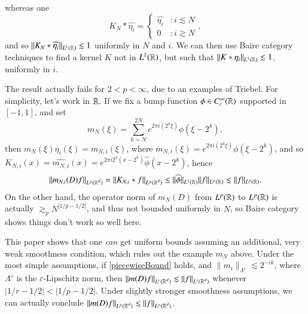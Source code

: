 whereas one
% 
%
\[ K_N * \widehat{\eta_i} = \begin{cases} \widehat{\eta_i} &: i \lesssim N \\ 0 &: i \gtrsim N \end{cases}, \]
%
and so $\| K_N * \widehat{\eta_i} \|_{L^1(\operatorname{\mathbb{R}})} \lesssim 1$ uniformly in $N$ and $i$. We can then use Baire category techniques to find a kernel $K$ not in $L^1(\operatorname{\mathbb{R}})$, but such that $\| K * \eta_i \|_{L^1(\operatorname{\mathbb{R}})} \lesssim 1$, uniformly in $i$.

The result actually fails for $2 < p < \infty$, due to an examples of Triebel. For simplicity, let's work in $\operatorname{\mathbb{R}}$. If we fix a bump function $\phi \in C_c^\infty(\operatorname{\mathbb{R}})$ supported in $[-1,1]$, and set
%
\[ m_N(\xi) = \sum_{k = N}^{2N} e^{2 \pi i (2^k \xi)} \phi(\xi - 2^k), \]
%
then $m_N(\xi) \eta_i(\xi) = m_{N,i}(\xi)$, where $m_{N,i}(\xi) = e^{2 \pi i (2^k \xi)} \phi(\xi - 2^k)$, and so $K_{N,i}(x) = \widehat{m_{N,i}}(x) = e^{2 \pi i 2^k(x - 2^k)} \widehat{\phi}(x - 2^k)$, hence
%
\[ \| m_{N,i}(D) f \|_{L^p(\operatorname{\mathbb{R}}^d)} = \| K_{N,i} * f \|_{L^p(\operatorname{\mathbb{R}}^d)} \leq \| \widehat{\phi} \|_{L^1(\operatorname{\mathbb{R}})} \| f \|_{L^p(\operatorname{\mathbb{R}})} \lesssim \| f \|_{L^p(\operatorname{\mathbb{R}})}. \]
%
On the other hand, the operator norm of $m_N(D)$ from $L^p(\operatorname{\mathbb{R}})$ to $L^p(\operatorname{\mathbb{R}})$ is actually $\gtrsim_p N^{|1/p - 1/2|}$, and thus not bounded uniformly in $N$, so Baire category shows things don't work so well here.

This paper shows that one \emph{can} get uniform bounds assuming an additional, very weak smoothness condition, which rules out the example $m_N$ above. Under the most simple assumptions, if \eqref{piecewiseBound} holds, and $\| m_i \|_{\Lambda^\varepsilon} \lesssim 2^{-ik}$, where $\Lambda^\varepsilon$ is the $\varepsilon$-Lipschitz norm, then $\| m(D) f \|_{L^r(\operatorname{\mathbb{R}}^d)} \lesssim \| f \|_{L^r(\operatorname{\mathbb{R}}^d)}$ whenever $|1/r - 1/2| < |1/p - 1/2|$. Under slightly stronger smoothness assumptions, we can actually conclude $\| m(D) f \|_{L^p(\operatorname{\mathbb{R}}^d)} \lesssim \| f \|_{L^p(\operatorname{\mathbb{R}}^d)}$.

